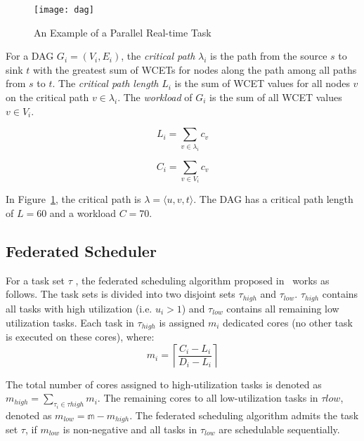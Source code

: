 \begin{figure}[!h]
  \centering
  \texttt{[image: dag]}
  \caption{An Example of a Parallel Real-time Task}
  \label{fig:dag}
\end{figure}

For a DAG ${G_i = (V_i, E_i)}$, the \emph{critical path} ${\lambda_i}$
is the path from the source ${s}$ to sink ${t}$ with the greatest sum
of WCETs for nodes along the path among all paths from ${s}$ to
${t}$. The \emph{critical path length} ${L_i}$ is the sum of WCET
values for all nodes ${v}$ on the critical path ${v \in \lambda_i}$.
The \emph{workload} of ${G_i}$ is the sum of all WCET values
${v \in V_i}$.

\begin{definition}
  \begin{equation}
    L_i = \sum_{v \in \lambda_i} c_v
  \end{equation}
\end{definition}

\begin{definition}[Workload of ${G_i}$]
  \begin{equation}
    C_i = \sum_{v \in V_i} c_v
  \end{equation}
\end{definition}

In Figure~\ref{fig:dag}, the critical path is
${\lambda = \langle u, v, t \rangle}$. The DAG has a critical path
length of ${L = 60}$ and a workload ${C = 70}$.

\subsection{Federated Scheduler}
For a task set $\tau$ , the federated scheduling algorithm proposed in~\cite{li2014analysis} works as
follows. The task sets is divided into two disjoint sets
$\tau_{high}$  and $\tau_{low}$. $\tau_{high}$ contains all tasks with
high utilization (i.e. $u_i > 1$) and $\tau_{low}$ contains all
remaining low utilization tasks. Each task in $\tau_{high}$ is
assigned $m_{i}$ dedicated cores (no other task is executed on these
cores), where: \begin{equation}\label{eq:m} m_{i} = \left\lceil \frac{C_{i} - L_{i}}{D_{i} - L_{i}}
\right\rceil \end{equation}

\noindent The total
number of cores assigned to high-utilization tasks is denoted as $m_{high} = \sum_{\tau_{i} \in \tau{high}} m_{i}$. 
The remaining cores to all low-utilization tasks in $\tau{low}$, denoted
as ${m_{low} =  \mathbb{m} - m_{high}}$. The federated scheduling algorithm admits
the task set ${\tau}$, if $m_{low}$ is non-negative and all tasks in
$\tau_{low}$ are schedulable sequentially.  

